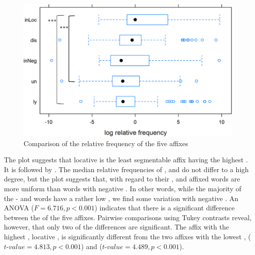 \begin{figure}  
	
	\includegraphics[scale=0.5]{images/Corpus/corpusComparisonRelFreq2.png}
	\caption{ Comparison of the relative frequency of the five affixes }
	\label{fig: corpus RelFreq comparison}

\end{figure}


The plot suggests that locative  is the least segmentable affix having the highest . It is followed by . The median relative {frequencies} of ,  and  do not differ to a high degree, but the plot suggests that, with regard to their ,  and affixed words are more uniform than words with negative . In other words, while the majority of the - and words have a rather low , we find some variation with negative . 
 An ANOVA ($F=6.716 ,p<0.001$) indicates that there is a significant difference between the  of the five affixes. Pairwise comparisons using Tukey contrasts reveal, however, that only two of the differences are significant. The affix with the highest , locative , is significantly different from the two affixes with the lowest ,  ($t$-$value=4.813, p<0.001$)  and  ($t$-$value=4.489, p<0.001$). 

            

